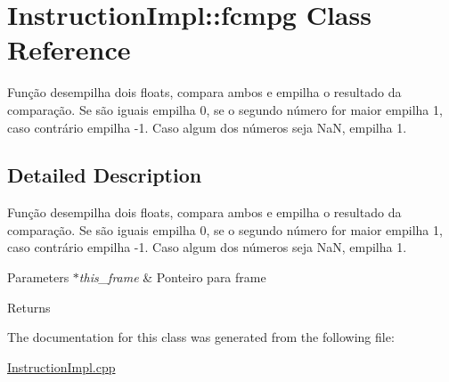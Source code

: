 \hypertarget{class_instruction_impl_1_1fcmpg}{}\section{Instruction\+Impl\+:\+:fcmpg Class Reference}
\label{class_instruction_impl_1_1fcmpg}


Função desempilha dois floats, compara ambos e empilha o resultado da comparação. Se são iguais empilha 0, se o segundo número for maior empilha 1, caso contrário empilha -\/1. Caso algum dos números seja NaN, empilha 1.  




\subsection{Detailed Description}
Função desempilha dois floats, compara ambos e empilha o resultado da comparação. Se são iguais empilha 0, se o segundo número for maior empilha 1, caso contrário empilha -\/1. Caso algum dos números seja NaN, empilha 1. 


\begin{DoxyParams}{Parameters}
{\em $\ast$this\+\_\+frame} & Ponteiro para frame \\
\hline
\end{DoxyParams}
\begin{DoxyReturn}{Returns}

\end{DoxyReturn}


The documentation for this class was generated from the following file\+:\begin{DoxyCompactItemize}
\item 
\hyperlink{_instruction_impl_8cpp}{Instruction\+Impl.\+cpp}\end{DoxyCompactItemize}
